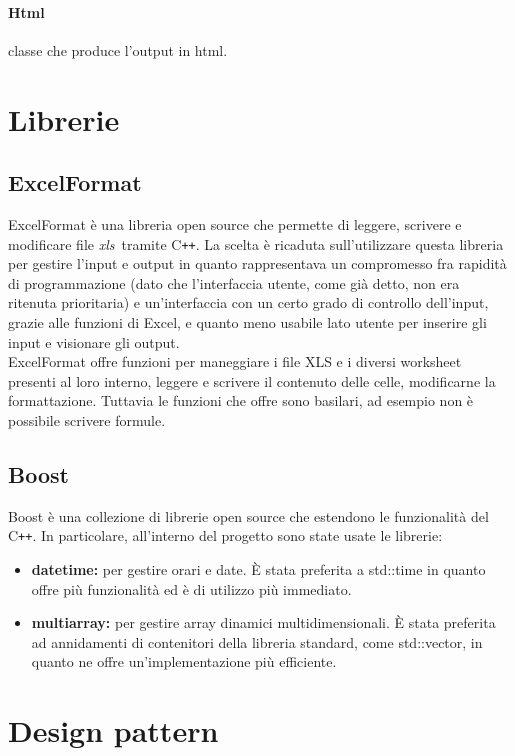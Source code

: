 \paragraph{Html} classe che produce l'output in html.
\section{Librerie}
\subsection{ExcelFormat}
ExcelFormat è una libreria open source che permette di leggere, scrivere e modificare file \emph{\gls{xls}}\glsfirstoccur\ tramite C\texttt{++}. La scelta è ricaduta sull'utilizzare questa libreria per gestire l'input e output in quanto rappresentava un compromesso fra rapidità di programmazione (dato che l'interfaccia utente, come già detto, non era ritenuta prioritaria) e un'interfaccia con un certo grado di controllo dell'input, grazie alle funzioni di Excel, e quanto meno usabile lato utente per inserire gli input e visionare gli output. \\
ExcelFormat offre funzioni per maneggiare i file XLS e i diversi worksheet presenti al loro interno, leggere e scrivere il contenuto delle celle, modificarne la formattazione. Tuttavia le funzioni che offre sono basilari, ad esempio non è possibile scrivere formule.
\subsection{Boost}
Boost  è una collezione di librerie open source che estendono le funzionalità del C\texttt{++}. In particolare, all'interno del progetto sono state usate le librerie:
\begin{itemize}
    \item \textbf{date\textunderscore time:} per gestire orari e date. È stata preferita a std::time in quanto offre più funzionalità ed è di utilizzo più immediato.
    \item\textbf{multi\textunderscore array:} per gestire array dinamici multidimensionali. È stata preferita ad annidamenti di contenitori della libreria standard, come std::vector, in quanto ne offre un'implementazione più efficiente.
\end{itemize}
\section{Design pattern}
